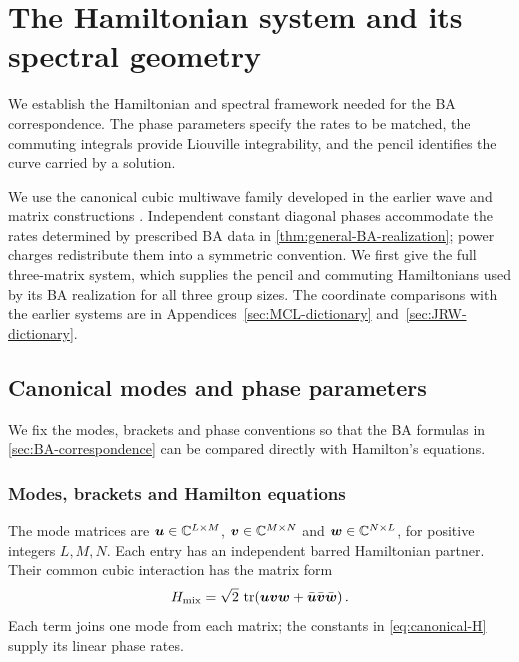 \section{The Hamiltonian system and its spectral geometry}
\label{sec:canonical}

We establish the Hamiltonian and spectral framework needed for the BA
correspondence. The phase parameters specify the rates to be matched,
the commuting integrals provide Liouville integrability, and the pencil
identifies the curve carried by a solution.

We use the canonical cubic multiwave family developed in the earlier
wave and matrix constructions
\cite{MenyukChenLee1983Integrable,WJB1986,JRW1991}.
Independent constant diagonal phases accommodate the rates determined
by prescribed BA data in \cref{thm:general-BA-realization}; power
charges redistribute them into a symmetric convention. We first give
the full three-matrix system, which supplies the pencil and commuting
Hamiltonians used by its BA realization for all three group sizes. The coordinate
comparisons with the earlier systems are in
Appendices~\ref{sec:MCL-dictionary} and~\ref{sec:JRW-dictionary}.

\subsection{Canonical modes and phase parameters}
\label{sec:canonical-phase-setup}

We fix the modes, brackets and phase conventions so that the BA
formulas in \cref{sec:BA-correspondence} can be compared directly with
Hamilton's equations.

\subsubsection{Modes, brackets and Hamilton equations}
\label{sec:canonical-modes}

The mode matrices are $\boldsymbol u\in\mathbb C^{L\times M}$,
$\boldsymbol v\in\mathbb C^{M\times N}$ and
$\boldsymbol w\in\mathbb C^{N\times L}$, for positive integers $L,M,N$.
Each entry has an independent barred Hamiltonian partner.
Their common cubic interaction has the matrix form
\begin{equation}\label{eq:intro-mixing}
 H_{\mathrm{mix}}=\sqrt2\,\operatorname{tr}\!\left(
 \boldsymbol u\boldsymbol v\boldsymbol w
 +\bar{\boldsymbol u}\bar{\boldsymbol v}\bar{\boldsymbol w}\right).
\end{equation}
Each term joins one mode from each matrix; the constants in
\cref{eq:canonical-H} supply its linear phase rates.

